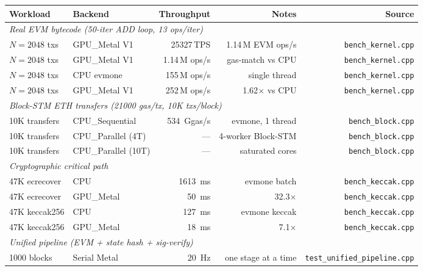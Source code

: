 \begin{table}[h]
\centering
\small
\begin{tabular}{llrrr}
\toprule
\textbf{Workload} & \textbf{Backend} & \textbf{Throughput} & \textbf{Notes} & \textbf{Source} \\
\midrule
\multicolumn{5}{l}{\textit{Real EVM bytecode (50-iter ADD loop, 13 ops/iter)}} \\
$N{=}2048$ txs   & GPU\_Metal V1 & \num{25327}\,TPS         & 1.14\,M EVM ops/s & \texttt{bench\_kernel.cpp} \\
$N{=}2048$ txs   & GPU\_Metal V1 & 1.14\,M ops/s            & gas-match vs CPU  & \texttt{bench\_kernel.cpp} \\
$N{=}2048$ txs   & CPU evmone    & 155\,M ops/s             & single thread     & \texttt{bench\_kernel.cpp} \\
$N{=}2048$ txs   & GPU\_Metal V1 & 252\,M ops/s             & 1.62$\times$ vs CPU & \texttt{bench\_kernel.cpp} \\
\midrule
\multicolumn{5}{l}{\textit{Block-STM ETH transfers (21000 gas/tx, 10K txs/block)}} \\
10K transfers   & CPU\_Sequential & \SI{534}{Ggas/s}         & evmone, 1 thread  & \texttt{bench\_block.cpp} \\
10K transfers   & CPU\_Parallel (4T) & ---                   & 4-worker Block-STM & \texttt{bench\_block.cpp} \\
10K transfers   & CPU\_Parallel (10T) & ---                  & saturated cores   & \texttt{bench\_block.cpp} \\
\midrule
\multicolumn{5}{l}{\textit{Cryptographic critical path}} \\
47K ecrecover   & CPU            & \SI{1613}{\milli\second}  & evmone batch      & \texttt{bench\_keccak.cpp} \\
47K ecrecover   & GPU\_Metal     & \SI{50}{\milli\second}    & 32.3$\times$      & \texttt{bench\_keccak.cpp} \\
47K keccak256   & CPU            & \SI{127}{\milli\second}   & evmone keccak     & \texttt{bench\_keccak.cpp} \\
47K keccak256   & GPU\_Metal     & \SI{18}{\milli\second}    & 7.1$\times$       & \texttt{bench\_keccak.cpp} \\
\midrule
\multicolumn{5}{l}{\textit{Unified pipeline (EVM + state hash + sig-verify)}} \\
1000 blocks     & Serial Metal   & \SI{20}{\hertz}           & one stage at a time & \texttt{test\_unified\_pipeline.cpp} \\

\end{tabular}
\end{table}
